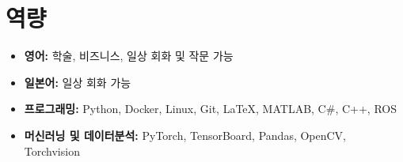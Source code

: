 \documentclass[a4paper,10pt]{extarticle}
\begin{document}
\section*{역량}
\begin{itemize}
    \item \textbf{영어: }학술, 비즈니스, 일상 회화 및 작문 가능
    \item \textbf{일본어: }일상 회화 가능
    \item \textbf{프로그래밍: }Python, Docker, Linux, Git, \LaTeX, MATLAB, C\#, C++, ROS
    \item \textbf{머신러닝 및 데이터분석:} PyTorch, TensorBoard, Pandas, OpenCV, Torchvision
\end{itemize}


\end{document}
